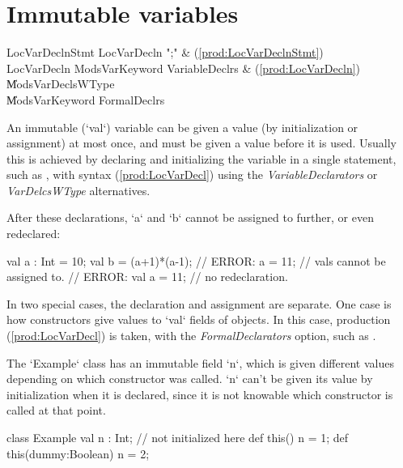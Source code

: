 \section{Immutable variables}
\label{FinalVariables}

\begin{bbgrammar}
     LocVarDeclnStmt \: LocVarDecln \xcd";" & (\ref{prod:LocVarDeclnStmt}) \\
         LocVarDecln \: Mods\opt VarKeyword VariableDeclrs & (\ref{prod:LocVarDecln}) \\
                     \| Mods\opt VarDeclsWType \\
                     \| Mods\opt VarKeyword FormalDeclrs \\
\end{bbgrammar}

An immutable (\xcd`val`) variable can be given a value (by initialization or
assignment) at 
most once, and must be given a value before it is used.  Usually this is
achieved by declaring and initializing the variable in a single statement, 
such as , with syntax 
(\ref{prod:LocVarDecl}) using the {\it VariableDeclarators} or {\it
VarDelcsWType} alternatives.

\begin{ex}
After these declarations, \xcd`a` and \xcd`b` cannot be assigned to further,
or even redeclared:  
\begin{xten}
val a : Int = 10;
val b = (a+1)*(a-1);
// ERROR: a = 11;  // vals cannot be assigned to.
// ERROR: val a = 11; // no redeclaration.
\end{xten}

\end{ex}

In two special cases, the declaration and assignment are separate.  One 
case is how constructors give values to \xcd`val` fields of objects.  In this
case, production (\ref{prod:LocVarDecl}) is taken, with the {\it
FormalDeclarators} option, such as  .  

\begin{ex} The
\xcd`Example` class has an immutable field \xcd`n`, which is given different
values depending on which constructor was called. \xcd`n` can't be given its
value by initialization when it is declared, since it is not knowable which
constructor is called at that point.  
\begin{xten}
class Example {
  val n : Int; // not initialized here
  def this() { n = 1; }
  def this(dummy:Boolean) { n = 2;}
}
\end{xten}
%
\end{ex}


